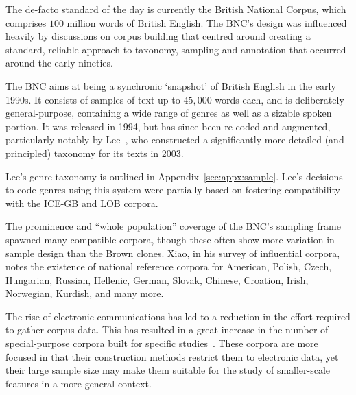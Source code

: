 




The de-facto standard of the day is currently the British National Corpus, which comprises $100$ million words of British English\cite{leech1993100}.  The BNC's design was influenced heavily by discussions on corpus building that centred around creating a standard, reliable approach to taxonomy, sampling and annotation that occurred around the early nineties.

The BNC aims at being a synchronic `snapshot' of British English in the early 1990s.  It consists of samples of text up to $45,000$ words each, and is deliberately general-purpose, containing a wide range of genres as well as a sizable spoken portion.  It was released in 1994, but has since been re-coded and augmented, particularly notably by Lee~\cite{lee2003bnc}, who constructed a significantly more detailed (and principled) taxonomy for its texts in 2003.

Lee's genre taxonomy is outlined in Appendix~\ref{sec:appx:sample}.  Lee's decisions to code genres using this system were partially based on fostering compatibility with the ICE-GB\cite{greenbaum1996international} and LOB\cite{johansson1986tagged} corpora.

The prominence and ``whole population'' coverage of the BNC's sampling frame spawned many compatible corpora, though these often show more variation in sample design than the Brown clones.  Xiao, in his survey of influential corpora, notes the existence of national reference corpora for American, Polish, Czech, Hungarian, Russian, Hellenic, German, Slovak, Chinese, Croation, Irish, Norwegian, Kurdish, and many more\cite{xiaoz2008}.  

% 


The rise of electronic communications has led to a reduction in the effort required to gather corpus data.  This has resulted in a great increase in the number of special-purpose corpora built for specific studies~\cite{westlabusenet2013,baroni2006building,Mair20060101T00000009215034355}.  These corpora are more focused in that their construction methods restrict them to electronic data, yet  their large sample size may make them suitable for the study of smaller-scale features in a more general context.


